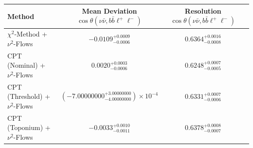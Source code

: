     \begin{tabular}{lccc}
        \toprule
        Method & Mean Deviation $\cos\theta(\nu\bar{\nu}, b\bar{b}\ell^+\ell^-)$ & Resolution $\cos\theta(\nu\bar{\nu}, b\bar{b}\ell^+\ell^-)$ \\
        \midrule
        $\chi^2$-Method + $\nu^2$-Flows & $-0.0109^{+0.0009}_{-0.0006}$ & $0.6364^{+0.0016}_{-0.0008}$ \\
        CPT (Nominal) + $\nu^2$-Flows & $0.0020^{+0.0003}_{-0.0006}$ & $0.6248^{+0.0007}_{-0.0005}$ \\
        CPT (Threshold) + $\nu^2$-Flows & $(-7.00000000^{+3.00000000}_{-4.00000000})\times 10^{-4}$ & $0.6331^{+0.0007}_{-0.0006}$ \\
        CPT (Toponium) + $\nu^2$-Flows & $-0.0033^{+0.0010}_{-0.0011}$ & $0.6378^{+0.0008}_{-0.0007}$ \\
        \bottomrule
    \end{tabular}